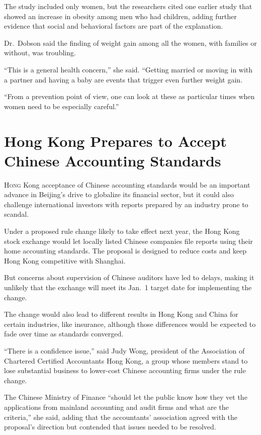 ﻿\documentclass[12pt]{article}
\begin{document}
The study included only women, but the researchers cited one earlier study that showed an increase
in obesity among men who had children, adding further evidence that social and behavioral factors
are part of the explanation.

Dr.~Dobson said the finding of weight gain among all the women, with families or without, was
troubling.

``This is a general health concern,'' she said. ``Getting married or moving in with a partner and
having a baby are events that trigger even further weight gain.

``From a prevention point of view, one can look at these as particular times when women need to be
especially careful.''

\section{Hong Kong Prepares to Accept Chinese Accounting Standards}

\lettrine{H}{ong} Kong acceptance of Chinese accounting standards would be
an important advance in Beijing's drive to globalize its financial sector, but it could also
challenge international investors with reports prepared by an industry prone to scandal.

Under a proposed rule change likely to take effect next year, the Hong Kong stock exchange would let
locally listed Chinese companies file reports using their home accounting standards. The proposal is
designed to reduce costs and keep Hong Kong competitive with Shanghai.

But concerns about supervision of Chinese auditors have led to delays, making it unlikely that the
exchange will meet its Jan.~1 target date for implementing the change.

The change would also lead to different results in Hong Kong and China for certain industries, like
insurance, although those differences would be expected to fade over time as standards converged.

``There is a confidence issue,'' said Judy Wong, president of the Association of Chartered Certified
Accountants Hong Kong, a group whose members stand to lose substantial business to lower-cost
Chinese accounting firms under the rule change.

The Chinese Ministry of Finance ``should let the public know how they vet the applications from
mainland accounting and audit firms and what are the criteria,'' she said, adding that the
accountants' association agreed with the proposal's direction but contended that issues needed to be
resolved.
\end{document}
